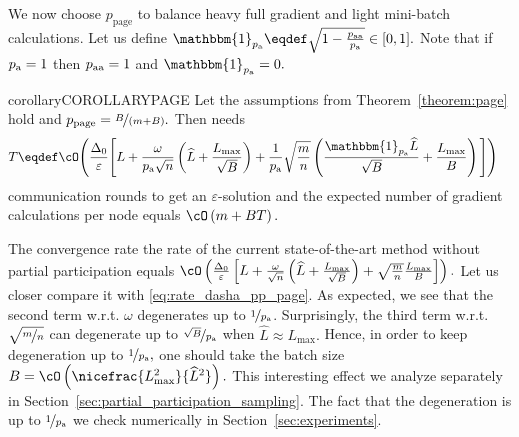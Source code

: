 \documentclass{article}
\newcommand{\algorithmname}{DASHA-PP}
\newcommand*{\probavailable}{\ensuremath{p_{\textnormal{a}}}}
\newcommand*{\probpairaa}{\ensuremath{p_{\textnormal{aa}}}}
\newcommand*{\probpage}{\ensuremath{p_{\text{page}}}}
\begin{document}
We now choose $\probpage$ to balance heavy full gradient and light mini-batch calculations. Let us define $\mathbbm{1}_{\probavailable} \eqdef \sqrt{1 - \frac{\probpairaa}{\probavailable}} \in [0, 1].$ Note that if $\probavailable = 1$ then $\probpairaa = 1$ and $\mathbbm{1}_{\probavailable} = 0.$
\begin{restatable}{corollary}{COROLLARYPAGE}
    \label{cor:mini_batch_oracle}
Let the assumptions from Theorem~\ref{theorem:page} hold and $\probpage = \nicefrac{B}{(m + B)}.$ 
Then \algname{\algorithmname-PAGE}
    needs 
    \begin{align}
      \label{eq:rate_dasha_pp_page}
      T &\eqdef \cO\Bigg(\frac{\Delta_0}{\varepsilon}\Bigg[L + \frac{\omega}{\probavailable\sqrt{n}}\left(\widehat{L} + \frac{L_{\max}}{\sqrt{B}}\right) + \frac{1}{\probavailable}\sqrt{\frac{m}{n}}\left(\frac{\mathbbm{1}_{\probavailable}\widehat{L}}{\sqrt{B}} + \frac{L_{\max}}{B}\right)\Bigg]\Bigg)
    \end{align}
    communication rounds to get an $\varepsilon$-solution and the expected number of gradient calculations per node equals $\cO\left(m + B T\right).$
\end{restatable}

The convergence rate the rate of the current state-of-the-art method  without partial participation equals
$\cO\left(\frac{\Delta_0}{\varepsilon}\left[L + \frac{\omega}{\sqrt{n}}\left(\widehat{L} + \frac{L_{\max}}{\sqrt{B}}\right) + \sqrt{\frac{m}{n}}\frac{L_{\max}}{B}\right]\right).$ Let us closer compare it with \eqref{eq:rate_dasha_pp_page}. As expected, we see that the second term w.r.t. $\omega$ degenerates up to $\nicefrac{1}{\probavailable}$. Surprisingly, the third term w.r.t. $\sqrt{\nicefrac{m}{n}}$ can degenerate up to $\nicefrac{\sqrt{B}}{\probavailable}$ when $\widehat{L} \approx L_{\max}.$ Hence, in order to keep degeneration up to $\nicefrac{1}{\probavailable},$ one should take the batch size $B = \cO\left(\nicefrac{L_{\max}^2}{\widehat{L}^2}\right).$ This interesting effect we analyze separately in Section~\ref{sec:partial_participation_sampling}. The fact that the degeneration is up to $\nicefrac{1}{\probavailable}$ we check numerically in Section~\ref{sec:experiments}.
\end{document}
